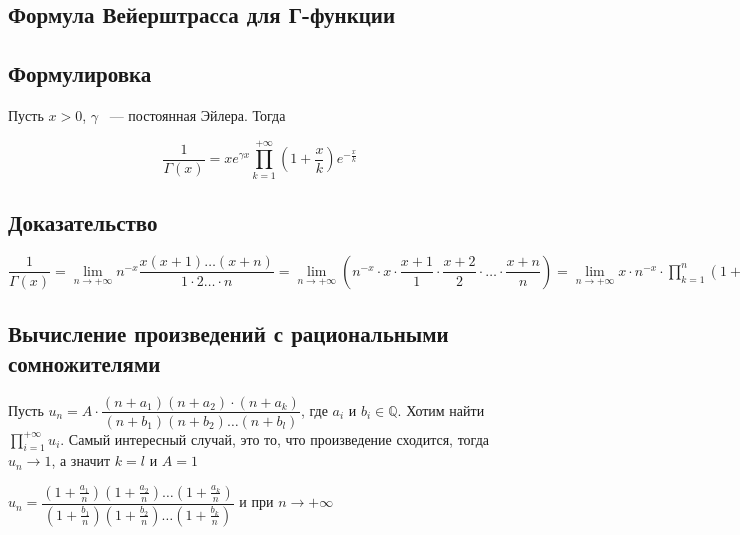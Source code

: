 \documentclass[../main.tex]{subfiles}
\begin{document}
\newpage


\subsection{Формула Вейерштрасса для Г-функции}

        \subsection*{Формулировка}
        
            Пусть $x > 0$, $\gamma$ ~--- постоянная Эйлера. Тогда
            
            $$\dfrac{1}{\Gamma(x)} = x e^{\gamma x} \prod\limits^{+\infty}_{k = 1} \left( 1 + \dfrac{x}{k} \right) e^{-\frac{x}{k}}$$
            
        \subsection*{Доказательство}
        
            $\dfrac{1}{\Gamma(x)} = \lim\limits_{n \rightarrow +\infty} n^{-x} \dfrac{x(x+1)\ldots(x+n)}{1 \cdot 2 \ldots \cdot n} = \lim\limits_{n \rightarrow +\infty} \left( n^{-x} \cdot x \cdot \dfrac{x + 1}{1} \cdot \dfrac{x + 2}{2} \cdot \ldots \cdot \dfrac{x + n}{n} \right) = \lim\limits_{n \rightarrow +\infty} x \cdot n^{-x} \cdot \prod^n_{k = 1} \left( 1 + \frac{x}{k} \right) = \lim\limits_{n \rightarrow +\infty} x e^{x \left(1 + \frac{1}{2} + \ldots + \frac{1}{n} \right)} \cdot e^{-x \ln n} \prod^n_{k = 1} \left( 1 + \dfrac{x}{k} \right) e^{-\frac{x}{k}} = x \cdot e^{\gamma x} \prod^{+\infty}_{k = 1} \left( 1 + \dfrac{x}{k} \right) e^{-\frac{x}{k}}$
            
\newpage


\subsection{Вычисление произведений с рациональными сомножителями}

        Пусть $u_n = A \cdot \dfrac{(n + a_1) (n + a_2) \cdot (n + a_k)}{(n + b_1) (n + b_2) \ldots (n + b_l)}$, где $a_i$ и $b_i \in \mathbb{Q}$. Хотим найти $\prod\limits^{+\infty}_{i = 1} u_i$. Самый интересный случай, это то, что произведение сходится, тогда $u_n \rightarrow 1$, а значит $k = l$ и $A = 1$

        $u_n = \dfrac{ \left(1 + \frac{a_1}{n} \right) \left(1 + \frac{a_2}{n} \right) \ldots \left(1 + \frac{a_k}{n} \right)}{\left(1 + \frac{b_1}{n} \right) \left(1 + \frac{b_2}{n} \right) \ldots \left( 1 + \frac{b_k}{n} \right)}$ и при $n \rightarrow +\infty$
        
\end{document}
